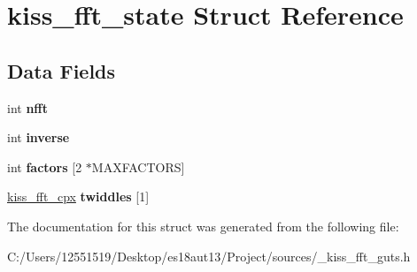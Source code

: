\hypertarget{structkiss__fft__state}{}\section{kiss\+\_\+fft\+\_\+state Struct Reference}
\label{structkiss__fft__state}
\subsection*{Data Fields}
\begin{DoxyCompactItemize}
\item 
\hypertarget{structkiss__fft__state_aa7446bded329a40e13aef0826e349791}{}int {\bfseries nfft}\label{structkiss__fft__state_aa7446bded329a40e13aef0826e349791}

\item 
\hypertarget{structkiss__fft__state_a8faed935610ffb08bf7ad9ea8d6c81d2}{}int {\bfseries inverse}\label{structkiss__fft__state_a8faed935610ffb08bf7ad9ea8d6c81d2}

\item 
\hypertarget{structkiss__fft__state_a2d5d0897276dbac0674fae556f951d18}{}int {\bfseries factors} \mbox{[}2 $\ast$M\+A\+X\+F\+A\+C\+T\+O\+R\+S\mbox{]}\label{structkiss__fft__state_a2d5d0897276dbac0674fae556f951d18}

\item 
\hypertarget{structkiss__fft__state_aa7d1cab86ec03a8ecddfe0d91ef0bd20}{}\hyperlink{structkiss__fft__cpx}{kiss\+\_\+fft\+\_\+cpx} {\bfseries twiddles} \mbox{[}1\mbox{]}\label{structkiss__fft__state_aa7d1cab86ec03a8ecddfe0d91ef0bd20}

\end{DoxyCompactItemize}


The documentation for this struct was generated from the following file\+:\begin{DoxyCompactItemize}
\item 
C\+:/\+Users/12551519/\+Desktop/es18aut13/\+Project/sources/\+\_\+kiss\+\_\+fft\+\_\+guts.\+h\end{DoxyCompactItemize}
